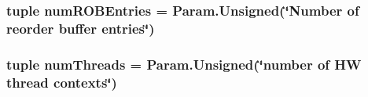 \label{classOzoneCPU_1_1DerivOzoneCPU_a4872233fcf1f251c1065c07bf3d288b4}
\hypertarget{classOzoneCPU_1_1DerivOzoneCPU_acb1025bcc322542b7e2fc418cd8d4308}{
\subsubsection[{numROBEntries}]{\setlength{\rightskip}{0pt plus 5cm}tuple {\bf numROBEntries} = Param.Unsigned(\char`\"{}Number of reorder buffer entries\char`\"{})}}
\label{classOzoneCPU_1_1DerivOzoneCPU_acb1025bcc322542b7e2fc418cd8d4308}
\hypertarget{classOzoneCPU_1_1DerivOzoneCPU_aac03a586f9fcb28bcbe8c3721888fa93}{
\subsubsection[{numThreads}]{\setlength{\rightskip}{0pt plus 5cm}tuple {\bf numThreads} = Param.Unsigned(\char`\"{}number of HW {\bf thread} contexts\char`\"{})}}
\label{classOzoneCPU_1_1DerivOzoneCPU_aac03a586f9fcb28bcbe8c3721888fa93}


